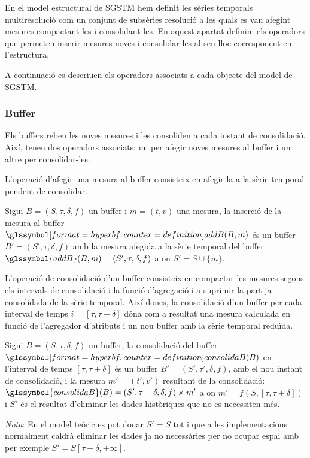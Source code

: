 En el model estructural de SGSTM hem definit les sèries temporals
multiresolució com un conjunt de subsèries resolució a les quals es
van afegint mesures compactant-les i consolidant-les. En aquest
apartat definim els operadors que permeten inserir mesures noves i
consolidar-les al seu lloc corresponent en l'estructura.

A continuació es descriuen els operadors associats a cada objecte del
model de SGSTM.


\subsubsection{Buffer}

Els buffers reben les noves mesures i les consoliden a cada instant de
consolidació. Així, tenen dos operadors associats: un per afegir noves
mesures al buffer i un altre per consolidar-les.


L'operació d'afegir una mesura al buffer consisteix en afegir-la a la
sèrie temporal pendent de consolidar.
\begin{definition}
  Sigui $B=(S,\tau,\delta,f)$ un buffer i $m=(t,v)$ una mesura, la
  inserció de la mesura al buffer $\glssymboldef{addB}(B,m)$ és un
  buffer $B'=(S',\tau,\delta,f)$ amb la mesura afegida a la sèrie
  temporal del buffer: $\glssymbol{addB}(B,m) = (S',\tau,\delta,f)$ a
  on $S'=S\cup \{m\}$.
\end{definition}


L'operació de consolidació d'un buffer consisteix en compactar les
mesures segons els intervals de consolidació i la funció d'agregació i
a suprimir la part ja consolidada de la sèrie temporal.  Així doncs,
la consolidació d'un buffer per cada interval de temps
$i=[\tau,\tau+\delta]$ dóna com a resultat una mesura calculada en
funció de l'agregador d'atributs i un nou buffer amb la sèrie temporal
reduïda.
\begin{definition}\label{def:model:consolidacio-buffer}
  Sigui $B=(S,\tau,\delta,f)$ un buffer, la consolidació del buffer
  $\glssymboldef{consolidaB}(B)$ en l'interval de temps
  $[\tau,\tau+\delta]$ és un buffer $B'=(S',\tau',\delta,f)$, amb el
  nou instant de consolidació, i la mesura $m'=(t',v')$ resultant de
  la consolidació: $\glssymbol{consolidaB}(B) =
  (S',\tau+\delta,\delta,f) \times m'$ a on
  $m'=f(S,[\tau,\tau+\delta])$ i $S'$ és el resultat d'eliminar les
  dades històriques que no es necessiten més.

  \emph{Nota}: En el model teòric es pot donar $S'=S$ tot i que a les
  implementacions normalment caldrà eliminar les dades ja no
  necessàries per no ocupar espai amb per exemple $S'=
  S[\tau+\delta,+\infty]$.
\end{definition}

